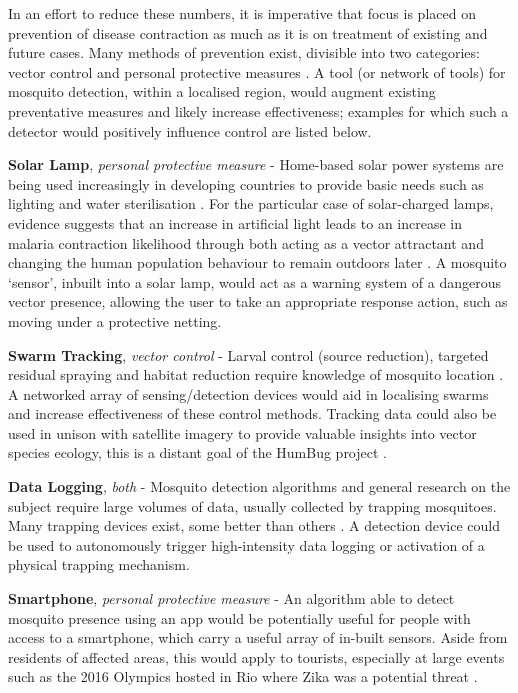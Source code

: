         In an effort to reduce these numbers, it is imperative that focus is placed on prevention of disease contraction as much as it is on treatment of existing and future cases. Many methods of prevention exist, divisible into two categories: vector control and personal protective measures \cite{Caraballo2014}. A tool (or network of tools) for mosquito detection, within a localised region, would augment existing preventative measures and likely increase effectiveness; examples for which such a detector would positively influence control are listed below.
        \begin{sitemize}
            \item{\textbf{Solar Lamp}, \textit{personal protective measure} - Home-based solar power systems are being used increasingly in developing countries to provide basic needs such as lighting and water sterilisation \cite{Akikur2013}. For the particular case of solar-charged lamps, evidence suggests that an increase in artificial light leads to an increase in malaria contraction likelihood through both acting as a vector attractant and changing the human population behaviour to remain outdoors later  \cite{Barghini2010}. A mosquito `sensor', inbuilt into a solar lamp, would act as a warning system of a dangerous vector presence, allowing the user to take an appropriate response action, such as moving under a protective netting.}
            \item{\textbf{Swarm Tracking}, \textit{vector control} - Larval control (source reduction), targeted residual spraying and habitat reduction require knowledge of mosquito location \cite{Caraballo2014,Pates2005,WHOVectorControl2016}. A networked array of sensing/detection devices would aid in localising swarms and increase effectiveness of these control methods. Tracking data could also be used in unison with satellite imagery to provide valuable insights into vector species ecology, this is a distant goal of the HumBug project \cite{HumBug2016}.}
            \item{\textbf{Data Logging}, \textit{both} - Mosquito detection algorithms and general research on the subject require large volumes of data, usually collected by trapping mosquitoes. Many trapping devices exist, some better than others \cite{Luhken2014}. A detection device could be used to autonomously trigger high-intensity data logging or activation of a physical trapping mechanism.}
            \item{\textbf{Smartphone}, \textit{personal protective measure} - An algorithm able to detect mosquito presence using an app would be potentially useful for people with access to a smartphone, which carry a useful array of in-built sensors. Aside from residents of affected areas, this would apply to tourists, especially at large events such as the 2016 Olympics hosted in Rio where Zika was a potential threat \cite{Petersen2016}.}

\end{sitemize}
